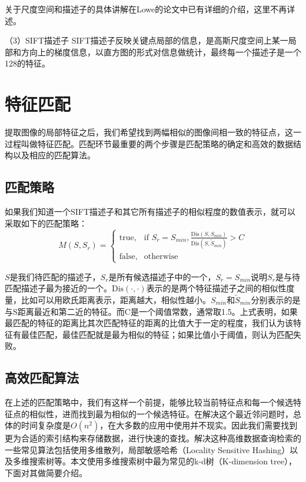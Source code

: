 关于尺度空间和描述子的具体讲解在Lowe的论文中\cite{Lowe:2004uq}已有详细的介绍，这里不再详述。

（3）SIFT描述子
SIFT描述子反映关键点局部的信息，是高斯尺度空间上某一局部和方向上的梯度信息，以直方图的形式对信息做统计，最终每一个描述子是一个128的特征。

\section{特征匹配}
提取图像的局部特征之后，我们希望找到两幅相似的图像间相一致的特征点，这一过程叫做特征匹配。匹配环节最重要的两个步骤是匹配策略的确定和高效的数据结构以及相应的匹配算法。

\subsection{匹配策略}
如果我们知道一个SIFT描述子和其它所有描述子的相似程度的数值表示，就可以采取如下的匹配策略：
\begin{equation}
  M(S,S_r) = 
\begin{cases} 
\text{true}, & \mbox{if } S_r = S_{min},\frac{\text{Dis}(S,S_{min})}{\text{Dis}(S,\tilde{S}_{min})} > C \\
\text{false}, & \mbox{otherwise}
\end{cases}
\end{equation}

\(S\)是我们待匹配的描述子，\(S_r\)是所有候选描述子中的一个，\(S_r = S_{min}\)说明\(S_r\)是与待匹配描述子最为接近的一个。\(\text{Dis}(\cdot,\cdot)\)表示的是两个特征描述子之间的相似性度量，比如可以用欧氏距离表示，距离越大，相似性越小。\(S_{min}\)和\(\tilde{S}_{min}\)分别表示的是与S距离最近和第二近的特征。而C是一个阈值常数，通常取1.5。上式表明，如果最匹配的特征的距离比其次匹配特征的距离的比值大于一定的程度，我们认为该特征有最佳匹配，最佳匹配就是最为相似的特征；如果比值小于阈值，则认为匹配失败。

\subsection{高效匹配算法}
在上述的匹配策略中，我们有这样一个前提，能够比较当前特征点和每一个候选特征点的相似性，进而找到最为相似的一个候选特征。在解决这个最近邻问题时，总体的时间复杂度是\(O(n^2)\)，在大多数的应用中使用并不现实。因此我们需要找到更为合适的索引结构来存储数据，进行快速的查找。解决这种高维数据查询检索的一些常见算法包括使用多维散列，局部敏感哈希（Locality Sensitive Hashing）以及多维搜索树等。本文使用多维搜索树中最为常见的k-d树（K-dimension tree），下面对其做简要介绍。

